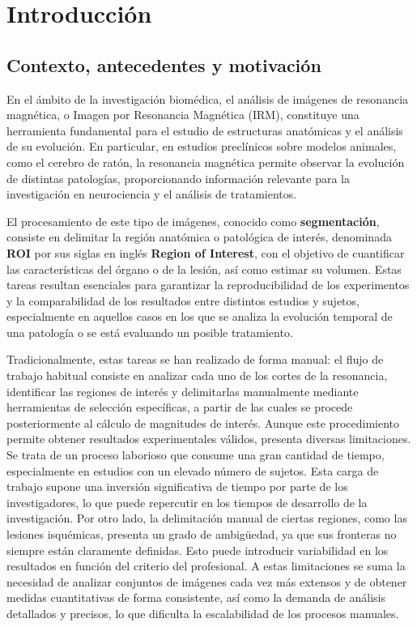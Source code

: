 \chapter{Introducción}
\label{cap:introduccion}

\section{Contexto, antecedentes y motivación}

En el ámbito de la investigación biomédica, el análisis de imágenes de resonancia magnética, o Imagen por Resonancia Magnética (IRM), constituye una herramienta fundamental para el estudio de estructuras anatómicas y el análisis de su evolución. En particular, en estudios preclínicos sobre modelos animales, como el cerebro de ratón, la resonancia magnética permite observar la evolución de distintas patologías, proporcionando información relevante para la investigación en neurociencia y el análisis de tratamientos. \citep{ucm_imagej_manual,saito2024preclinicalMRI}

El procesamiento de este tipo de imágenes, conocido como \textbf{segmentación}, consiste en delimitar la región anatómica o patológica de interés, denominada \textbf{ROI} por sus siglas en inglés \textbf{Region of Interest}, con el objetivo de cuantificar las características del órgano o de la lesión, así como estimar su volumen. Estas tareas resultan esenciales para garantizar la reproducibilidad de los experimentos y la comparabilidad de los resultados entre distintos estudios y sujetos, especialmente en aquellos casos en los que se analiza la evolución temporal de una patología o se está evaluando un posible tratamiento. \citep{ucm_imagej_manual}

Tradicionalmente, estas tareas se han realizado de forma manual: el flujo de trabajo habitual consiste en analizar cada uno de los cortes de la resonancia, identificar las regiones de interés y delimitarlas manualmente mediante herramientas de selección específicas, a partir de las cuales se procede posteriormente al cálculo de magnitudes de interés.
Aunque este procedimiento permite obtener resultados experimentales válidos, presenta diversas limitaciones. Se trata de un proceso laborioso que consume una gran cantidad de tiempo, especialmente en estudios con un elevado número de sujetos. Esta carga de trabajo supone una inversión significativa de tiempo por parte de los investigadores, lo que puede repercutir en los tiempos de desarrollo de la investigación.
Por otro lado, la delimitación manual de ciertas regiones, como las lesiones isquémicas, presenta un grado de ambigüedad, ya que sus fronteras no siempre están claramente definidas. Esto puede introducir variabilidad en los resultados en función del criterio del profesional. 
A estas limitaciones se suma la necesidad de analizar conjuntos de imágenes cada vez más extensos y de obtener medidas cuantitativas de forma consistente, así como la demanda de análisis detallados y precisos, lo que dificulta la escalabilidad de los procesos manuales.
\citep{ucm_imagej_manual,veigaCanuto2022interobserverMRI,liu2022interobserverSegmentation}


